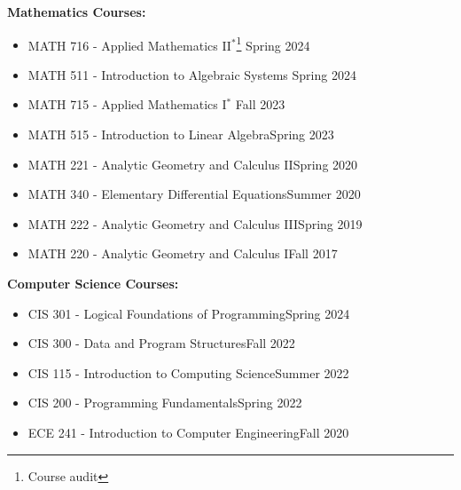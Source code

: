 \documentclass{article}
\begin{document}
\textbf{Mathematics Courses:}
\begin{itemize}
	\item MATH 716 - Applied Mathematics II$ ^* $\footnote[3]{Course audit} \hfill Spring 2024
	\item MATH 511 - Introduction to Algebraic Systems \hfill Spring 2024
	\item MATH 715 - Applied Mathematics I$ ^* $ \hfill Fall 2023
	\item MATH 515 - Introduction to Linear Algebra\hfill Spring 2023
	\item MATH 221 - Analytic Geometry and Calculus II\hfill Spring 2020
	\item MATH 340 - Elementary Differential Equations\hfill Summer 2020
	\item MATH 222 - Analytic Geometry and Calculus III\hfill Spring 2019
	\item MATH 220 - Analytic Geometry and Calculus I\hfill Fall 2017\\[-12pt]
\end{itemize}
\textbf{Computer Science Courses:}
\begin{itemize}
	\item CIS 301 - Logical Foundations of Programming\hfill Spring 2024
	\item CIS 300 - Data and Program Structures\hfill Fall 2022
	\item CIS 115 - Introduction to Computing Science\hfill Summer 2022
	\item CIS 200 - Programming Fundamentals\hfill Spring 2022
	\item ECE 241 - Introduction to Computer Engineering\hfill Fall 2020\\[0pt]
\end{itemize}
\end{document}
